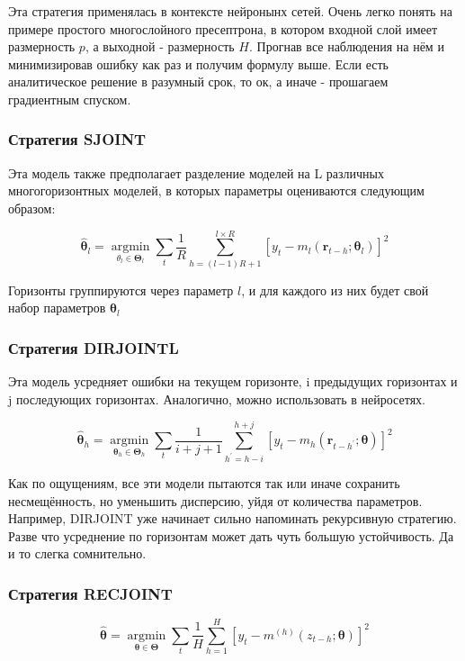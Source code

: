 \documentclass[a4paper,12pt]{article}
\begin{document}
Эта стратегия применялась в контексте нейронынх сетей. Очень легко понять на примере простого многослойного пресептрона, в котором входной слой имеет размерность $ p $, а выходной - размерность $ H $.  Прогнав все наблюдения на нём и минимизировав ошибку как раз и получим формулу выше. Если есть аналитическое решение в разумный срок, то ок, а иначе - прошагаем градиентным спуском.

\subsubsection{Стратегия SJOINT}

Эта модель также предполагает разделение моделей на L различных многогоризонтных моделей, в которых параметры оцениваются следующим образом:

\[
\hat{\boldsymbol{\theta}}_{l}=\underset{\theta_{l} \in \boldsymbol{\Theta}_{l}}{\operatorname{argmin}} \sum_{t} \frac{1}{R} \sum_{h=(l-1)R+1}^{l \times R}\left[y_{t}-m_{l}\left(\boldsymbol{r}_{t-h} ; \boldsymbol{\theta}_{l}\right)\right]^{2}
\]

Горизонты группируются через параметр $ l $, и для каждого из них будет свой набор параметров $ \boldsymbol{\theta}_{l} $

\subsubsection{Стратегия DIRJOINTL}

Эта модель усредняет ошибки на текущем горизонте, i предыдущих горизонтах и j последующих горизонтах.  Аналогично, можно использовать в нейросетях. 

\[
\hat{\boldsymbol{\theta}}_{h}=\underset{\boldsymbol{\theta}_{h} \in \boldsymbol{\Theta}_{h}}{\operatorname{argmin}} \sum_{t} \frac{1}{i+j+1} \sum_{h^{\prime}=h-i}^{h+j}\left[y_{t}-m_{h}\left(\boldsymbol{r}_{t-h^{\prime}} ; \boldsymbol{\theta}\right)\right]^{2}
\]

Как по ощущениям, все эти модели пытаются так или иначе сохранить несмещённость, но уменьшить дисперсию, уйдя от количества параметров. Например, DIRJOINT уже начинает сильно напоминать рекурсивную стратегию. Разве что усреднение по горизонтам может дать чуть большую устойчивость. Да и то слегка сомнительно.

\subsubsection{Стратегия RECJOINT}
\[
\hat{\boldsymbol{\theta}}=\underset{\boldsymbol{\theta} \in \boldsymbol{\Theta}}{\operatorname{argmin}} \sum_{t} \frac{1}{H} \sum_{h=1}^{H}\left[y_{t}-m^{(h)}\left(z_{t-h} ; \boldsymbol{\theta}\right)\right]^{2}
\]
\end{document}
